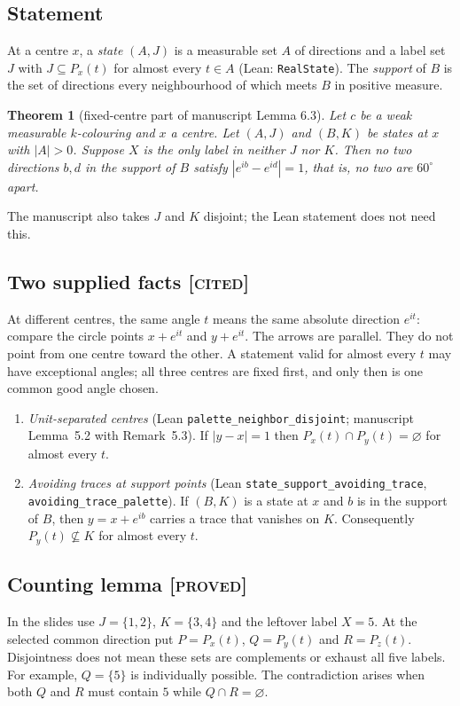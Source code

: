 \documentclass[11pt]{article}
\newtheorem{theorem}{Theorem}[section]
\theoremstyle{definition}
\theoremstyle{remark}
\newcommand{\st}[1]{\textsc{[#1]}}
\begin{document}
\subsection{Statement}
At a centre $x$, a \emph{state} $(A,J)$ is a measurable set $A$ of directions and a label set $J$ with $J\subseteq P_x(t)$ for almost every $t\in A$ (Lean: \texttt{RealState}). The \emph{support} of $B$ is the set of directions every neighbourhood of which meets $B$ in positive measure.

\begin{theorem}[fixed-centre part of manuscript Lemma 6.3]\label{thm:three}
Let $c$ be a weak measurable $k$-colouring and $x$ a centre. Let $(A,J)$ and $(B,K)$ be states at $x$ with $|A|>0$. Suppose $X$ is the only label in neither $J$ nor $K$. Then no two directions $b,d$ in the support of $B$ satisfy $|e^{ib}-e^{id}|=1$, that is, no two are $60^\circ$ apart.
\end{theorem}
The manuscript also takes $J$ and $K$ disjoint; the Lean statement does not need this.

\subsection{Two supplied facts \st{cited}}
At different centres, the same angle $t$ means the same absolute direction
$e^{it}$: compare the circle points $x+e^{it}$ and $y+e^{it}$. The arrows are
parallel. They do not point from one centre toward the other. A statement valid
for almost every $t$ may have exceptional angles; all three centres are fixed
first, and only then is one common good angle chosen.

\begin{enumerate}
\item[(F1)] \emph{Unit-separated centres} (Lean \texttt{palette\_\allowbreak{}neighbor\_\allowbreak{}disjoint}; manuscript Lemma~5.2 with Remark~5.3). If $|y-x|=1$ then $P_x(t)\cap P_y(t)=\varnothing$ for almost every $t$.
\item[(F2)] \emph{Avoiding traces at support points} (Lean \texttt{state\_\allowbreak{}support\_\allowbreak{}avoiding\_\allowbreak{}trace}, \texttt{avoiding\_\allowbreak{}trace\_\allowbreak{}palette}). If $(B,K)$ is a state at $x$ and $b$ is in the support of $B$, then $y=x+e^{ib}$ carries a trace that vanishes on $K$. Consequently $P_y(t)\not\subseteq K$ for almost every $t$.
\end{enumerate}

\subsection{Counting lemma \st{proved}}
In the slides use $J=\{1,2\}$, $K=\{3,4\}$ and the leftover label $X=5$.
At the selected common direction put $P=P_x(t)$, $Q=P_y(t)$ and $R=P_z(t)$.
Disjointness does not mean these sets are complements or exhaust all five labels.
For example, $Q=\{5\}$ is individually possible. The contradiction arises when
both $Q$ and $R$ must contain $5$ while $Q\cap R=\varnothing$.
\end{document}
